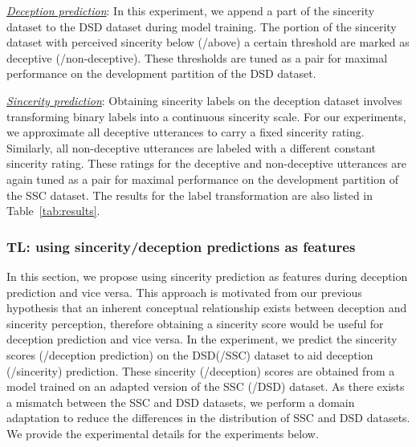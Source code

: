 \documentclass{article}
\begin{document}
\begin{spacing}{0.89}
\underline{\it Deception prediction}: 
In this experiment, we append a part of the sincerity dataset to the DSD dataset during model training.
The portion of the sincerity dataset with perceived sincerity below (/above) a certain threshold are marked as deceptive (/non-deceptive). 
These thresholds are tuned as a pair for maximal performance on the development partition of the DSD dataset. 

\underline{\it Sincerity prediction}:
Obtaining sincerity labels on the deception dataset involves transforming binary labels into a continuous sincerity scale.
For our experiments, we approximate all deceptive utterances to carry a fixed sincerity rating. 
Similarly, all non-deceptive utterances are labeled with a different constant sincerity rating.
These ratings for the deceptive and non-deceptive utterances are again tuned as a pair for maximal performance on the development partition of the SSC dataset.
The results for the label transformation are also listed in Table~\ref{tab:results}.

\vspace{-2mm}
\subsubsection{TL: using sincerity/deception predictions as features}
\vspace{-2mm}
\label{sec:gfkonly}
In this section, we propose using sincerity prediction as features during deception prediction and vice versa.
This approach is motivated from our previous hypothesis that an inherent conceptual relationship exists between deception and sincerity perception, therefore obtaining a sincerity score would be useful for deception prediction and vice versa.
In the experiment, we predict the sincerity scores (/deception prediction) on the DSD(/SSC) dataset to aid deception (/sincerity) prediction. 
These sincerity (/deception) scores are obtained from a model trained on an adapted version of the SSC (/DSD) dataset.
As there exists a mismatch between the SSC and DSD datasets, we perform a domain adaptation to reduce the differences in the distribution of SSC and DSD datasets.
We provide the experimental details for the experiments below.


\end{spacing}
\end{document}

